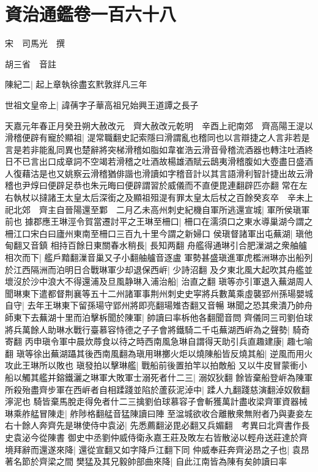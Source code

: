 \section{資治通鑑卷一百六十八}
宋　司馬光　撰

胡三省　音註

陳紀二|{
	起上章執徐盡玄黓敦牂凡三年}


世祖文皇帝上|{
	諱蒨字子華高祖兄始興王道譚之長子}


天嘉元年春正月癸丑朔大赦改元　齊大赦改元乾明　辛酉上祀南郊　齊高陽王湜以滑稽便辟有寵於顯祖|{
	湜常職翻史記索隱曰滑謂亂也稽同也以言辯捷之人言非若是言是若非能亂同異也楚辭將突梯滑稽如脂如韋崔浩云滑音骨稽流酒器也轉注吐酒終日不已言出口成章詞不空竭若滑稽之吐酒故楊雄酒賦云鴟夷滑稽腹如大壺盡日盛酒人復藉沽是也又姚察云滑稽猶俳諧也滑讀如字稽音計以其言語滑利智計捷出故云滑稽也尹焞曰便辟足恭也朱元晦曰便辟謂習於威儀而不直便毘連翻辟匹亦翻}
常在左右執杖以撻諸王太皇太后深銜之及顯祖殂湜有罪太皇太后杖之百餘癸亥卒　辛未上祀北郊　齊主自晉陽還至鄴　二月乙未高州刺史紀機自軍所逃還宣城|{
	軍所侯瑱軍前也}
據郡應王琳涇令賀當遷討平之王琳至柵口|{
	柵口在濡須口之東水導巢湖今謂之柵江口宋白曰廬州東南至柵口三百九十里今謂之新婦口}
侯瑱督諸軍出屯蕪湖|{
	瑱他甸翻又音鎮}
相持百餘日東關春水稍長|{
	長知两翻}
舟艦得通琳引合肥漅湖之衆舳艫相次而下|{
	艦戶黯翻漅音巢又子小翻舳艫音逐盧}
軍勢甚盛瑱進軍虎檻洲琳亦出船列於江西隔洲而泊明日合戰琳軍少却退保西㟁|{
	少詩沼翻}
及夕東北風大起吹其舟艦並壞沒於沙中浪大不得還浦及旦風静琳入浦治船|{
	治直之翻}
瑱等亦引軍退入蕪湖周人聞琳東下遣都督荆襄等五十二州諸軍事荆州刺史史寜將兵數萬乘虛襲郢州孫瑒嬰城自守|{
	去年王琳東下留孫瑒守郢州將即亮翻瑒雉杏翻又音暢}
琳聞之恐其衆潰乃帥舟師東下去蕪湖十里而泊擊柝聞於陳軍|{
	帥讀曰率柝他各翻聞音問}
齊儀同三司劉伯球將兵萬餘人助琳水戰行臺慕容恃德之子子會將鐵騎二千屯蕪湖西㟁為之聲勢|{
	騎奇寄翻}
丙申瑱令軍中晨炊蓐食以待之時西南風急琳自謂得天助引兵直趣建康|{
	趣七喻翻}
瑱等徐出蕪湖躡其後西南風翻為瑱用琳擲火炬以燒陳船皆反燒其船|{
	逆風而用火攻此王琳所以敗也}
瑱發拍以擊琳艦|{
	戰船前後置拍竿以拍敵船}
又以牛皮冒蒙衝小船以觸其艦并鎔鐵灑之琳軍大敗軍士溺死者什二三|{
	溺奴狄翻}
餘皆棄船登㟁為陳軍所殺殆盡齊步軍在西㟁者自相蹂踐並陷於蘆荻泥淖中|{
	蹂人九翻踐慈演翻淖奴敎翻濘泥也}
騎皆棄馬脫走得免者什二三擒劉伯球慕容子會斬獲萬計盡收梁齊軍資器械琳乘舴艋冒陳走|{
	舴陟格翻艋音猛陳讀曰陣}
至湓城欲收合離散衆無附者乃與妻妾左右十餘人奔齊先是琳使侍中袁泌|{
	先悉薦翻泌毘必翻又兵媚翻　考異曰北齊書作長史袁泌今從陳書}
御史中丞劉仲威侍衛永嘉王莊及敗左右皆散泌以輕舟送莊達於齊境拜辭而還遂來降|{
	還從宣翻又如字降戶江翻下同}
仲威奉莊奔齊泌昂之子也|{
	袁昂著名節於齊梁之間}
樊猛及其兄毅帥部曲來降|{
	自此江南皆為陳有矣帥讀曰率}
